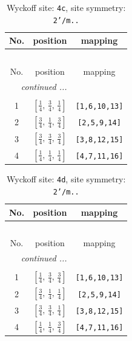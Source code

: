 \documentclass[fleqn,8pt]{jsarticle}
\begin{document}
\renewcommand{\arraystretch}{1.2}
\begin{longtable}{ccc}
\caption{Wyckoff site: {\tt 4c}, site symmetry: {\tt 2'/m..}}
 \\
 \hline \hline
No. & position & mapping \\ \hline \endfirsthead

\multicolumn{2}{l}{\tablename\ \thetable{}} \\
 \hline \hline
No. & position & mapping \\ \hline \endhead

 \hline \hline
\multicolumn{2}{r}{\footnotesize\it continued ...} \\ \endfoot

 \hline \hline
\multicolumn{2}{r}{} \\ \endlastfoot

1 & $\left[ \frac{1}{4},\, \frac{3}{4},\, \frac{1}{4} \right]$ & {\tt [1,6,10,13]} \\ \hline
2 & $\left[ \frac{3}{4},\, \frac{1}{4},\, \frac{3}{4} \right]$ & {\tt [2,5,9,14]} \\ \hline
3 & $\left[ \frac{3}{4},\, \frac{3}{4},\, \frac{3}{4} \right]$ & {\tt [3,8,12,15]} \\ \hline
4 & $\left[ \frac{1}{4},\, \frac{1}{4},\, \frac{1}{4} \right]$ & {\tt [4,7,11,16]} \\
\end{longtable}
\renewcommand{\arraystretch}{1.2}
\begin{longtable}{ccc}
\caption{Wyckoff site: {\tt 4d}, site symmetry: {\tt 2'/m..}}
 \\
 \hline \hline
No. & position & mapping \\ \hline \endfirsthead

\multicolumn{2}{l}{\tablename\ \thetable{}} \\
 \hline \hline
No. & position & mapping \\ \hline \endhead

 \hline \hline
\multicolumn{2}{r}{\footnotesize\it continued ...} \\ \endfoot

 \hline \hline
\multicolumn{2}{r}{} \\ \endlastfoot

1 & $\left[ \frac{1}{4},\, \frac{3}{4},\, \frac{3}{4} \right]$ & {\tt [1,6,10,13]} \\ \hline
2 & $\left[ \frac{3}{4},\, \frac{1}{4},\, \frac{1}{4} \right]$ & {\tt [2,5,9,14]} \\ \hline
3 & $\left[ \frac{3}{4},\, \frac{3}{4},\, \frac{1}{4} \right]$ & {\tt [3,8,12,15]} \\ \hline
4 & $\left[ \frac{1}{4},\, \frac{1}{4},\, \frac{3}{4} \right]$ & {\tt [4,7,11,16]} \\
\end{longtable}
\end{document}
